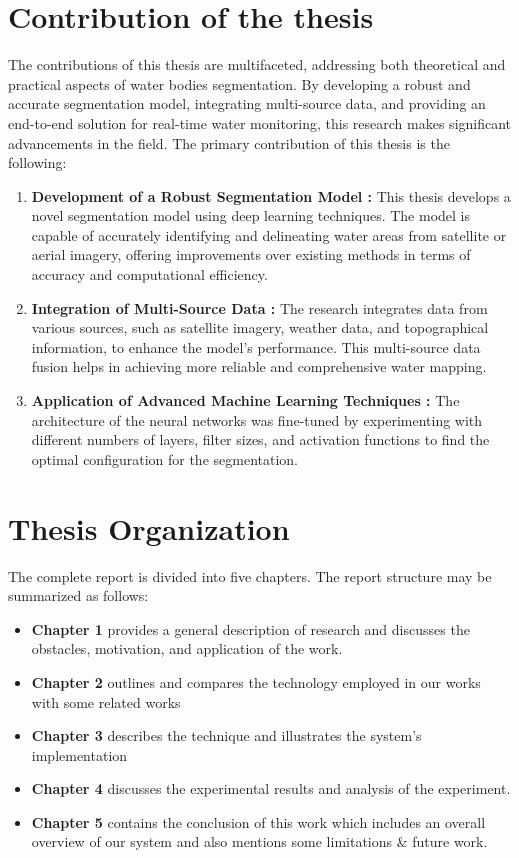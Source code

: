 \section{Contribution of the thesis}
The contributions of this thesis are multifaceted, addressing both theoretical and practical aspects of water bodies segmentation. By developing a robust and accurate segmentation model, integrating multi-source data, and providing an end-to-end solution for real-time water monitoring, this research makes significant advancements in the field. The primary contribution of this thesis is the following:
\begin{enumerate}
    \item \textbf{Development of a Robust Segmentation Model : }This thesis develops a novel segmentation model using deep learning techniques. The model is capable of accurately identifying and delineating water areas from satellite or aerial imagery, offering improvements over existing methods in terms of accuracy and computational efficiency.
    \item \textbf{Integration of Multi-Source Data : }The research integrates data from various sources, such as satellite imagery, weather data, and topographical information, to enhance the model's performance. This multi-source data fusion helps in achieving more reliable and comprehensive water mapping.

    \item \textbf{Application of Advanced Machine Learning Techniques : }The architecture of the neural networks was fine-tuned by experimenting with different numbers of layers, filter sizes, and activation functions to find the optimal configuration for the segmentation.
\end{enumerate}

\section{Thesis Organization}
The complete report is divided into five chapters. The report structure may be summarized as follows:
\begin{itemize}
    \item \textbf{Chapter 1} provides a general description of research and discusses the obstacles, motivation, and application of the work.
    \item \textbf{Chapter 2} outlines and compares the technology employed in our works with some related works
    \item \textbf{Chapter 3} describes the technique and illustrates the system’s implementation
    \item \textbf{Chapter 4} discusses the experimental results and analysis of the experiment.
    \item \textbf{Chapter 5} contains the conclusion of this work which includes an overall overview of our system and also mentions some limitations \& future work.
\end{itemize}






